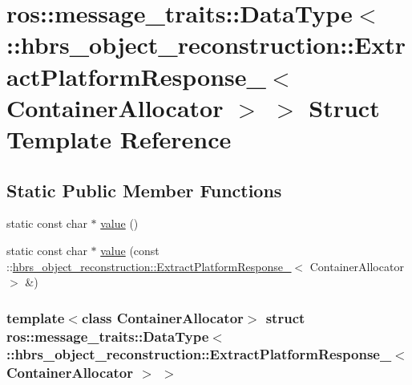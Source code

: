 \hypertarget{structros_1_1message__traits_1_1_data_type_3_01_1_1hbrs__object__reconstruction_1_1_extract_plata106760921e8766d99f0637aeebd8c04}{\section{ros\-:\-:message\-\_\-traits\-:\-:\-Data\-Type$<$ \-:\-:hbrs\-\_\-object\-\_\-reconstruction\-:\-:\-Extract\-Platform\-Response\-\_\-$<$ \-Container\-Allocator $>$ $>$ \-Struct \-Template \-Reference}
\label{structros_1_1message__traits_1_1_data_type_3_01_1_1hbrs__object__reconstruction_1_1_extract_plata106760921e8766d99f0637aeebd8c04}
}
\subsection*{\-Static \-Public \-Member \-Functions}
\begin{DoxyCompactItemize}
\item 
static const char $\ast$ \hyperlink{structros_1_1message__traits_1_1_data_type_3_01_1_1hbrs__object__reconstruction_1_1_extract_plata106760921e8766d99f0637aeebd8c04_a68b08f7b426f57be1e02fe1078bbe5e0}{value} ()
\item 
static const char $\ast$ \hyperlink{structros_1_1message__traits_1_1_data_type_3_01_1_1hbrs__object__reconstruction_1_1_extract_plata106760921e8766d99f0637aeebd8c04_a8fc41c73b28644a112f19f8295c1a8d0}{value} (const \-::\hyperlink{structhbrs__object__reconstruction_1_1_extract_platform_response__}{hbrs\-\_\-object\-\_\-reconstruction\-::\-Extract\-Platform\-Response\-\_\-}$<$ \-Container\-Allocator $>$ \&)
\end{DoxyCompactItemize}
\subsubsection*{template$<$class Container\-Allocator$>$ struct ros\-::message\-\_\-traits\-::\-Data\-Type$<$ \-::hbrs\-\_\-object\-\_\-reconstruction\-::\-Extract\-Platform\-Response\-\_\-$<$ Container\-Allocator $>$ $>$}



